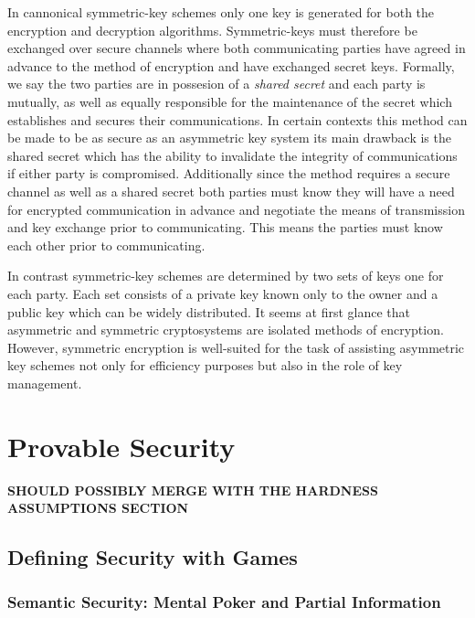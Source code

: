 In cannonical symmetric-key schemes only one key is generated for both the encryption and decryption algorithms. Symmetric-keys must therefore be exchanged over secure channels where both communicating parties have agreed in advance to the method of
encryption and have exchanged secret keys. 
\newline
Formally, we say the two parties are in possesion of a \textit{shared secret} and each party is mutually, as well as equally responsible for the maintenance of the secret which establishes and secures their communications. 
In certain contexts this method can be made to be as secure as an asymmetric key system its main drawback is the shared secret which has the ability to invalidate the integrity of communications if either party is compromised.
\newline
Additionally since the method requires a secure channel as well as a shared secret both parties must know they will have a need for encrypted communication in advance and negotiate the means of transmission and key exchange prior to communicating. This means the parties must know each other prior to communicating. 


In contrast symmetric-key schemes are determined by two sets of keys one for each party. Each set consists of a private key known only to the owner and a public key which can be widely distributed. It seems at first glance that asymmetric and symmetric cryptosystems are isolated methods of encryption. However, symmetric
encryption is well-suited for the task of assisting asymmetric key
schemes not only for efficiency purposes but also in the role of key
management. 

\section{Provable Security} 

\textbf{SHOULD POSSIBLY MERGE WITH THE HARDNESS ASSUMPTIONS SECTION} 

\subsection{Defining Security with Games} 

\subsubsection{Semantic Security: Mental Poker and Partial Information} 

